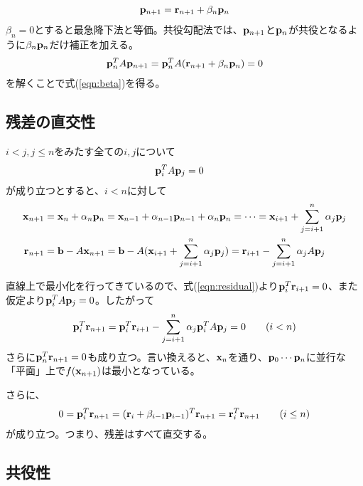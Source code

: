 \documentclass[11pt]{jarticle}
\begin{document}
\begin{align}
  {\bf p}_{n+1} = {\bf r}_{n+1} + \beta_n {\bf p}_n
\end{align}
$\beta_n=0$とすると最急降下法と等価。共役勾配法では、${\bf p}_{n+1}$と${\bf p}_{n}$が共役となるように$\beta_n {\bf p}_n$だけ補正を加える。
\begin{align}
  {\bf p}_n^T A {\bf p}_{n+1} = {\bf p}_n^T A ({\bf r}_{n+1} + \beta_n {\bf p}_n) = 0
\end{align}
を解くことで式(\ref{eqn:beta})を得る。

\subsection{残差の直交性}

$i < j, j \le n$をみたす全ての$i,j$について
\begin{align}
  {\bf p}_i^T A {\bf p}_j &= 0
\end{align}
が成り立つとすると、$i<n$に対して
\begin{align}
  {\bf x}_{n+1} &= {\bf x}_n + \alpha_n {\bf p}_n
  = {\bf x}_{n-1} + \alpha_{n-1} {\bf p}_{n-1} + \alpha_n {\bf p}_n = \cdots
  = {\bf x}_{i+1} + \sum_{j=i+1}^n \alpha_{j} {\bf p}_j \\
  {\bf r}_{n+1} &= {\bf b} - A {\bf x}_{n+1} = {\bf b} - A ({\bf x}_{i+1} + \sum_{j=i+1}^n \alpha_{j} {\bf p}_j)
  = {\bf r}_{i+1} - \sum_{j=i+1}^n \alpha_{j} A {\bf p}_j
\end{align}

直線上で最小化を行ってきているので、式(\ref{eqn:residual})より${\bf p}_i^T  {\bf r}_{i+1} = 0$、また仮定より${\bf p}_i^T A {\bf p}_j = 0$。したがって
\begin{align}
  {\bf p}_i^T {\bf r}_{n+1} = {\bf p}_i^T {\bf r}_{i+1} - \sum_{j=i+1}^n \alpha_{j} {\bf p}_i^T A {\bf p}_j = 0 \qquad (i < n)
\end{align}
さらに${\bf p}_n^T  {\bf r}_{n+1} = 0$も成り立つ。言い換えると、${\bf x}_n$を通り、${\bf p}_0 \cdots {\bf p}_n$に並行な「平面」上で$f({\bf x}_{n+1})$は最小となっている。

さらに、
\begin{align}
  0 = {\bf p}_i^T {\bf r}_{n+1} = ({\bf r}_i + \beta_{i-1} {\bf p}_{i-1})^T {\bf r}_{n+1} = {\bf r}_i^T {\bf r}_{n+1} \qquad (i \le n)
\end{align}
が成り立つ。つまり、残差はすべて直交する。

\subsection{共役性}
\end{document}
